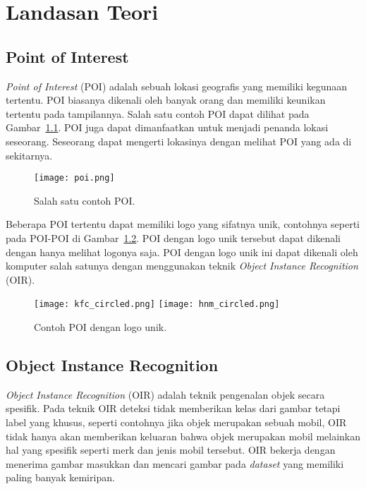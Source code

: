 \chapter{Landasan Teori}
\label{chap:landasan_teori}

\section{Point of Interest}
\label{sec:poi}

\textit{Point of Interest} (POI) adalah sebuah lokasi geografis yang memiliki kegunaan tertentu. POI biasanya dikenali oleh banyak orang dan memiliki keunikan tertentu pada tampilannya. Salah satu contoh POI dapat dilihat pada Gambar~\ref{fig:poi}. POI juga dapat dimanfaatkan untuk menjadi penanda lokasi seseorang. Seseorang dapat mengerti lokasinya dengan melihat POI yang ada di sekitarnya.
\vspace{-9pt}
\begin{figure}[H]
	\centering
	\texttt{[image: poi.png]}
	\caption{Salah satu contoh POI.}
	\label{fig:poi}
\end{figure}
\vspace{-9pt}
Beberapa POI tertentu dapat memiliki logo yang sifatnya unik, contohnya seperti pada POI-POI di Gambar~\ref{fig:poi_logo}. POI dengan logo unik tersebut dapat dikenali dengan hanya melihat logonya saja. POI dengan logo unik ini dapat dikenali oleh komputer salah satunya dengan menggunakan teknik \textit{Object Instance Recognition} (OIR). 
\begin{figure}[H]
	\centering
	\texttt{[image: kfc\_circled.png]}
	\texttt{[image: hnm\_circled.png]}
	\caption{Contoh POI dengan logo unik.}
	\label{fig:poi_logo}
\end{figure}

\section{Object Instance Recognition}
\label{sec:oir}

\textit{Object Instance Recognition} (OIR) adalah teknik pengenalan objek secara spesifik. Pada teknik OIR deteksi tidak memberikan kelas dari gambar tetapi label yang khusus, seperti contohnya jika objek merupakan sebuah mobil, OIR tidak hanya akan memberikan keluaran bahwa objek merupakan mobil melainkan hal yang spesifik seperti merk dan jenis mobil tersebut. OIR bekerja dengan menerima gambar masukkan dan mencari gambar pada \textit{dataset} yang memiliki paling banyak kemiripan.

